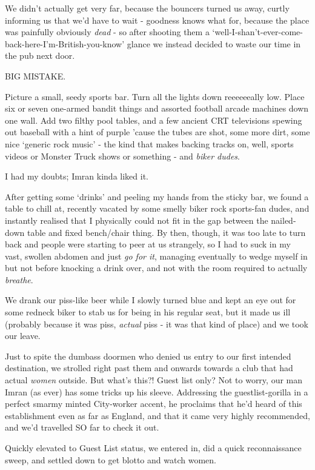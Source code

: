 \documentclass[a5paper,titlepage,draft]{book}
\begin{document}
We didn't actually get very far, because the bouncers turned us away, curtly informing us that we'd have to wait - goodness knows what for, because the place was painfully obviously \emph{dead} - so after shooting them a `well-I-shan't-ever-come-back-here-I'm-British-you-know' glance we instead decided to waste our time in the pub next door.

BIG MISTAKE.

Picture a small, seedy sports bar.  Turn all the lights down reeeeeeally low.  Place six or seven one-armed bandit things and assorted football arcade machines down one wall.  Add two filthy pool tables, and a few ancient CRT televisions spewing out baseball with a hint of purple 'cause the tubes are shot, some more dirt, some nice `generic rock music' - the kind that makes backing tracks on, well, sports videos or Monster Truck shows or something - and \emph{biker dudes}.

I had my doubts; Imran kinda liked it.

After getting some `drinks' and peeling my hands from the sticky bar, we found a table to chill at, recently vacated by some smelly biker rock sports-fan dudes, and instantly realised that I physically could not fit in the gap between the nailed-down table and fixed bench/chair thing.  By then, though, it was too late to turn back and people were starting to peer at us strangely, so I had to suck in my vast, swollen abdomen and just \emph{go for it}, managing eventually to wedge myself in but not before knocking a drink over, and not with the room required to actually \emph{breathe}.

We drank our piss-like beer while I slowly turned blue and kept an eye out for some redneck biker to stab us for being in his regular seat, but it made us ill (probably because it was piss, \emph{actual} piss - it was that kind of place) and we took our leave.

Just to spite the dumbass doormen who denied us entry to our first intended destination, we strolled right past them and onwards towards a club that had actual \emph{women} outside.  But what's this?!  Guest list only?  Not to worry, our man Imran (as ever) has some tricks up his sleeve.  Addressing the guestlist-gorilla in a perfect smarmy minted City-worker accent, he proclaims that he'd heard of this establishment even as far as England, and that it came very highly recommended, and we'd travelled SO far to check it out.

Quickly elevated to Guest List status, we entered in, did a quick reconnaissance sweep, and settled down to get blotto and watch women.
\end{document}
